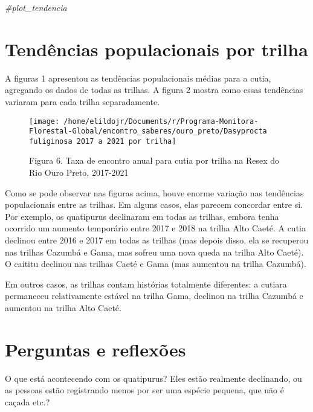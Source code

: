\documentclass[]{tufte-handout}
\newenvironment{Shaded}{}{}
\newcommand{\CommentTok}[1]{\textcolor[rgb]{0.38,0.63,0.69}{\textit{#1}}}
\begin{document}
\begin{Shaded}
\begin{Highlighting}[]
\CommentTok{\#plot\_tendencia}
\end{Highlighting}
\end{Shaded}

\hypertarget{tenduxeancias-populacionais-por-trilha}{%
\section{Tendências populacionais por
trilha}\label{tenduxeancias-populacionais-por-trilha}}

A figuras 1 apresentou as tendências populacionais médias para a cutia,
agregando os dados de todas as trilhas. A figura 2 mostra como essas
tendências variaram para cada trilha separadamente.

\begin{figure}
\texttt{[image: /home/elildojr/Documents/r/Programa-Monitora-Florestal-Global/encontro\_saberes/ouro\_preto/Dasyprocta fuliginosa 2017 a 2021 por trilha]} \caption[Figura 6]{Figura 6. Taxa de encontro anual para cutia por trilha na Resex do Rio Ouro Preto, 2017-2021}\label{fig:unnamed-chunk-7}
\end{figure}

Como se pode observar nas figuras acima, houve enorme variação nas
tendências populacionais entre as trilhas. Em alguns casos, elas parecem
concordar entre si. Por exemplo, os quatipurus declinaram em todas as
trilhas, embora tenha ocorrido um aumento temporário entre 2017 e 2018
na trilha Alto Caeté. A cutia declinou entre 2016 e 2017 em todas as
trilhas (mas depois disso, ela se recuperou nas trilhas Cazumbá e Gama,
mas sofreu uma nova queda na trilha Alto Caeté). O caititu declinou nas
trilhas Caeté e Gama (mas aumentou na trilha Cazumbá).

Em outros casos, as trilhas contam histórias totalmente diferentes: a
cutiara permaneceu relativamente estável na trilha Gama, declinou na
trilha Cazumbá e aumentou na trilha Alto Caeté.

\hypertarget{perguntas-e-reflexuxf5es}{%
\section{Perguntas e reflexões}\label{perguntas-e-reflexuxf5es}}

O que está acontecendo com os quatipurus? Eles estão realmente
declinando, ou as pessoas estão registrando menos por ser uma espécie
pequena, que não é caçada etc.?
\end{document}
